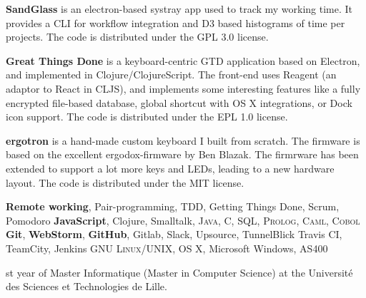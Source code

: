 \begin{rubric}{
}
\entry*[SandGlass] \textbf{SandGlass} is an electron-based systray app used to track my working time. It provides a CLI for workflow integration and D3 based histograms of time per projects. The code is distributed under the GPL 3.0 license.

 \textbf{Great Things Done} is a keyboard-centric GTD application based on Electron, and implemented in \mbox{Clojure/ClojureScript}. The front-end uses Reagent (an adaptor to React in CLJS), and implements some interesting features like a fully encrypted file-based database, global shortcut with OS X integrations, or Dock icon support. The code is distributed under the EPL 1.0 license.


 \textbf{ergotron} is a hand-made custom keyboard I built from scratch. The firmware is based on the excellent ergodox-firmware by Ben Blazak. The firmrware has been extended to support a lot more keys and LEDs, leading to a new hardware layout. The code is distributed under the MIT license.


\entry*[Agile] \textbf{Remote working}, Pair-programming, TDD, Getting Things Done, Scrum, Pomodoro
\entry*[Programming] \textbf{JavaScript}, Clojure, Smalltalk, \textsc{Java}, C, \textsc{SQL}, \textsc{Prolog}, \textsc{Caml}, \textsc{Cobol}
\entry*[Software] \textbf{Git}, \textbf{WebStorm}, \textbf{GitHub}, Gitlab, Slack, Upsource, TunnelBlick
 Travis CI, TeamCity, Jenkins
\entry*[System] \textsc{GNU Linux/UNIX}, OS X, Microsoft Windows, AS400

\textup{st} year of Master Informatique (Master in Computer Science) at the Université des Sciences et Technologies de Lille.


\end{rubric}
